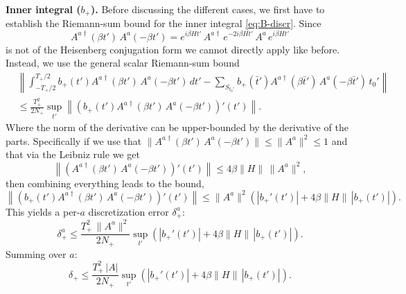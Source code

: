 \medskip
\noindent\textbf{Inner integral ($b_+$).}
Before discussing the different cases, we first have to establish the Riemann-sum bound for the inner integral \eqref{eq:B-discr}. Since 
$$
A^{a\dagger}(\beta t')\,A^a(-\beta t') = e^{i\beta H t'}\,A^{a\dagger}\,e^{-2i\beta H t'}\,A^a\,e^{i\beta H t'}
$$
is not of the Heisenberg conjugation form we cannot directly apply \cite[Lemma III.1]{chen2023efficient} like before. Instead, we use the general scalar Riemann-sum bound
\begin{equation}
    \begin{split}
        &\left\|\int_{-T_+/2}^{T_+/2} b_+(t')A^{a\dagger}(\beta t')\,A^a(-\beta t')\,dt' - \sum_{S_{t_0'}} b_+(\bar{t}')A^{a\dagger}(\beta \bar{t}')\,A^a(-\beta \bar{t}')\,t_0'\right\| \\
        &\leq \frac{T_+^2}{2N_+}\sup_{t'}\left\|\left(b_+(t')A^{a\dagger}(\beta t')\,A^a(-\beta t')\right)'(t')\right\|.
    \end{split}
\end{equation}
Where the norm of the derivative can be upper-bounded by the derivative of the parts. Specifically if we use that $\|A^{a\dagger}(\beta t')\,A^a(-\beta t')\| \leq \|A^a\|^2 \leq 1$ and that via the Leibniz rule we get
\begin{equation}
    \left\|\left(A^{a\dagger}(\beta t')\,A^a(-\beta t')\right)'(t')\right\| \leq 4\beta\|H\|\,\|A^a\|^2,
\end{equation}
then combining everything leads to the bound, 
\begin{equation}
    \left\|\left(b_+(t')A^{a\dagger}(\beta t')\,A^a(-\beta t')\right)'(t')\right\| \leq \|A^a\|^2\left(|b_+'(t')| + 4\beta\|H\|\,|b_+(t')|\right).
\end{equation}
This yields a per-$a$ discretization error $\delta_+^a$:
\begin{equation}
    \delta_+^a \leq \frac{T_+^2\,\|A^a\|^2}{2N_+}\sup_{t'}\!\left(|b_+'(t')| + 4\beta\|H\|\,|b_+(t')|\right).
\end{equation}
Summing over $a$:
\begin{equation} \label{eq:inner-discr-error}
    \delta_+ \leq \frac{T_+^2\,|A|}{2N_+}\sup_{t'}\!\left(|b_+'(t')| + 4\beta\|H\|\,|b_+(t')|\right).
\end{equation}

